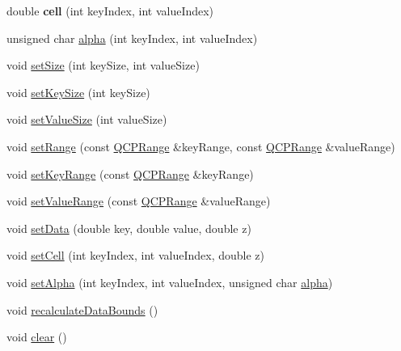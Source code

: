 \begin{DoxyCompactItemize}
\item 
double {\bfseries cell} (int key\+Index, int value\+Index)\hypertarget{class_q_c_p_color_map_data_af51ecd21f347adbf87b4cce4e1f5cbd6}{}\label{class_q_c_p_color_map_data_af51ecd21f347adbf87b4cce4e1f5cbd6}

\item 
unsigned char \hyperlink{class_q_c_p_color_map_data_a4f7e6b7a97017400cbbd46f0660e68ea}{alpha} (int key\+Index, int value\+Index)
\item 
void \hyperlink{class_q_c_p_color_map_data_a0d9ff35c299d0478b682bfbcdd9c097e}{set\+Size} (int key\+Size, int value\+Size)
\item 
void \hyperlink{class_q_c_p_color_map_data_ac7ef70e383aface34b44dbde49234b6b}{set\+Key\+Size} (int key\+Size)
\item 
void \hyperlink{class_q_c_p_color_map_data_a0893c9e3914513048b45e3429ffd16f2}{set\+Value\+Size} (int value\+Size)
\item 
void \hyperlink{class_q_c_p_color_map_data_aad9c1c7c703c1339489fc730517c83d4}{set\+Range} (const \hyperlink{class_q_c_p_range}{Q\+C\+P\+Range} \&key\+Range, const \hyperlink{class_q_c_p_range}{Q\+C\+P\+Range} \&value\+Range)
\item 
void \hyperlink{class_q_c_p_color_map_data_a0738c485f3c9df9ea1241b7a8bb6a86e}{set\+Key\+Range} (const \hyperlink{class_q_c_p_range}{Q\+C\+P\+Range} \&key\+Range)
\item 
void \hyperlink{class_q_c_p_color_map_data_ada1b2680ba96a5f4175b6d341cf75d23}{set\+Value\+Range} (const \hyperlink{class_q_c_p_range}{Q\+C\+P\+Range} \&value\+Range)
\item 
void \hyperlink{class_q_c_p_color_map_data_afd2083ccfd6987ec94aa7ef8e91ca39a}{set\+Data} (double key, double value, double z)
\item 
void \hyperlink{class_q_c_p_color_map_data_a8e75eaf8746596319032a93f3d2d0683}{set\+Cell} (int key\+Index, int value\+Index, double z)
\item 
void \hyperlink{class_q_c_p_color_map_data_aaf7de5b34c58f38d8f4c1ceb064a876c}{set\+Alpha} (int key\+Index, int value\+Index, unsigned char \hyperlink{class_q_c_p_color_map_data_a4f7e6b7a97017400cbbd46f0660e68ea}{alpha})
\item 
void \hyperlink{class_q_c_p_color_map_data_ab235ade8a4d64bd3adb26a99b3dd57ee}{recalculate\+Data\+Bounds} ()
\item 
void \hyperlink{class_q_c_p_color_map_data_a9910ba830e96955bd5c8e5bef1e77ef3}{clear} ()
\item 

\end{DoxyCompactItemize}
